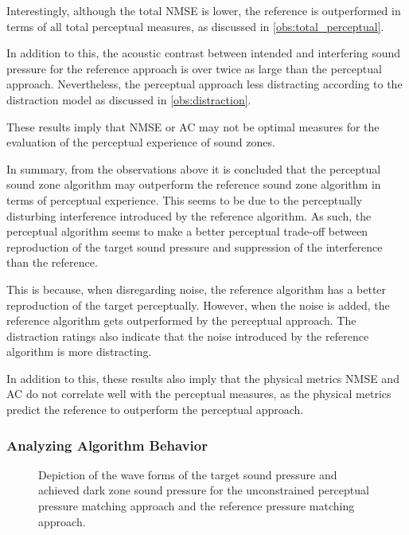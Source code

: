 \begin{enumerate}
        Interestingly, although the total NMSE is lower, the reference is outperformed in terms of all total perceptual 
        measures, as discussed in \autoref{obs:total_perceptual}.

        In addition to this, the acoustic contrast between intended and interfering sound pressure for 
        the reference approach is over twice as large than the perceptual approach.
        Nevertheless, the perceptual approach less distracting according to the distraction model as 
        discussed in \autoref{obs:distraction}.

        These results imply that NMSE or AC may not be optimal measures for the evaluation of the  
        perceptual experience of sound zones.
        \label{obs:physical}
\end{enumerate}

In summary, from the observations above it is concluded that the perceptual sound zone algorithm may
outperform the reference sound zone algorithm in terms of perceptual experience.
This seems to be due to the perceptually disturbing interference introduced by the reference algorithm.
As such, the perceptual algorithm seems to make a better perceptual trade-off between reproduction of the 
target sound pressure and suppression of the interference than the reference.

This is because, when disregarding noise, the reference algorithm has a better reproduction of the target perceptually.
However, when the noise is added, the reference algorithm gets outperformed by the perceptual approach.
The distraction ratings also indicate that the noise introduced by the reference algorithm is more distracting.

In addition to this, these results also imply that the physical metrics NMSE and AC do not correlate well 
with the perceptual measures, as the physical metrics predict the reference to outperform the perceptual approach.

\subsubsection*{Analyzing Algorithm Behavior}
\begin{figure}[]
    \centering
    
    \caption{Depiction of the wave forms of the target sound pressure and achieved dark zone sound pressure for the 
        unconstrained perceptual pressure matching approach and the reference pressure matching approach.}
        \label{fig:results:evaluation:unconstrained_results:behavior}
\end{figure}

